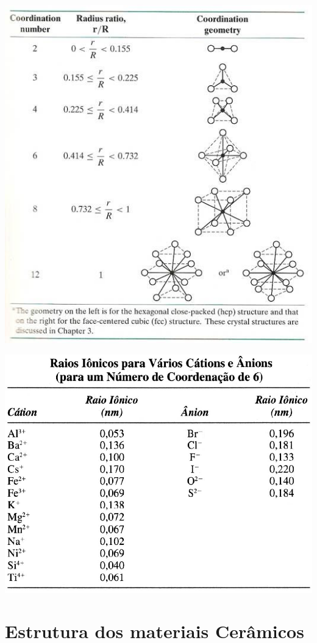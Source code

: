  \includegraphics[scale=0.3,trim={0 0 0 0}]{figures/RELraio}
 
 
 \includegraphics[scale=0.25,trim={0 0 0 0}]{figures/raio}
 

 \section{Estrutura dos materiais Cerâmicos}
 

